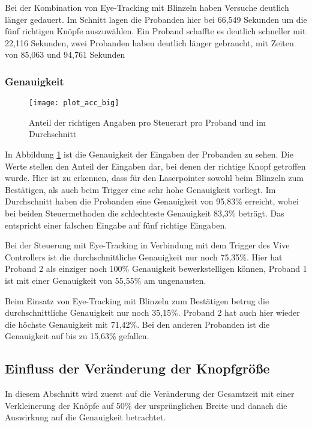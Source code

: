 Bei der Kombination von Eye-Tracking mit Blinzeln haben Versuche deutlich länger gedauert. Im Schnitt lagen die Probanden hier bei 66,549 Sekunden um die fünf richtigen Knöpfe auszuwählen. Ein Proband schaffte es deutlich schneller mit 22,116 Sekunden, zwei Probanden haben deutlich länger gebraucht, mit Zeiten von 85,063 und 94,761 Sekunden

\subsubsection{Genauigkeit}

\begin{figure}[!htbp]
	\centering
	\texttt{[image: plot\_acc\_big]}
	\caption[Anteil der richtigen Angaben pro Steuerart pro Proband und im Durchschnitt]{Anteil der richtigen Angaben pro Steuerart pro Proband und im Durchschnitt}
	\label{fig:totalACCBig}
\end{figure}
In Abbildung \ref{fig:totalACCBig} ist die Genauigkeit der Eingaben der Probanden zu sehen. Die Werte stellen den Anteil der Eingaben dar, bei denen der richtige Knopf getroffen wurde. Hier ist zu erkennen, dass  für den Laserpointer sowohl beim Blinzeln zum Bestätigen, als auch beim Trigger eine sehr hohe Genauigkeit vorliegt. Im Durchschnitt haben die Probanden eine Genauigkeit von 95,83\% erreicht, wobei bei beiden Steuermethoden die schlechteste Genauigkeit 83,3\% beträgt. Das entspricht einer falschen Eingabe auf fünf richtige Eingaben.

Bei der Steuerung mit Eye-Tracking in Verbindung mit dem Trigger des Vive Controllers ist die durchschnittliche Genauigkeit nur noch 75,35\%. Hier hat Proband 2 als einziger noch 100\% Genauigkeit bewerkstelligen können, Proband 1 ist mit einer Genauigkeit von 55,55\% am ungenausten. 

Beim Einsatz von Eye-Tracking mit Blinzeln zum Bestätigen betrug die durchschnittliche Genauigkeit nur noch 35,15\%. Proband 2 hat auch hier wieder die höchste Genauigkeit mit 71,42\%. Bei den anderen Probanden ist die Genauigkeit auf bis zu 15,63\% gefallen. 



\subsection{Einfluss der Veränderung der Knopfgröße}
In diesem Abschnitt wird zuerst auf die Veränderung der Gesamtzeit mit einer Verkleinerung der Knöpfe auf 50\% der ursprünglichen Breite und danach die Auswirkung auf die Genauigkeit betrachtet. 
